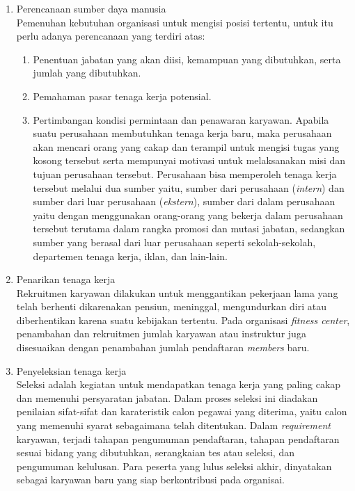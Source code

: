 \begin{enumerate}

\item Perencanaan sumber daya manusia \\
Pemenuhan kebutuhan organisasi untuk mengisi posisi tertentu, untuk itu perlu adanya perencanaan yang terdiri atas:
\begin{enumerate}
	
\item Penentuan jabatan yang akan diisi, kemampuan yang dibutuhkan, serta jumlah yang dibutuhkan.

\item Pemahaman pasar tenaga kerja potensial.

\item Pertimbangan kondisi permintaan dan penawaran karyawan. Apabila suatu perusahaan membutuhkan tenaga kerja baru, maka perusahaan akan mencari orang yang cakap dan terampil untuk mengisi tugas yang kosong tersebut serta mempunyai motivasi untuk melaksanakan misi dan tujuan perusahaan tersebut. Perusahaan bisa memperoleh tenaga kerja tersebut melalui dua sumber yaitu, sumber dari perusahaan (\textit{intern}) dan sumber dari luar perusahaan (\textit{ekstern}), sumber dari dalam perusahaan yaitu dengan menggunakan orang-orang yang bekerja dalam perusahaan tersebut terutama dalam rangka promosi dan mutasi jabatan, sedangkan sumber yang berasal dari luar perusahaan seperti sekolah-sekolah, departemen tenaga kerja, iklan, dan lain-lain.

\end{enumerate}

\item Penarikan tenaga kerja \\
Rekruitmen karyawan dilakukan untuk menggantikan pekerjaan lama yang telah berhenti dikarenakan pensiun, meninggal, mengundurkan diri atau diberhentikan karena suatu kebijakan tertentu. Pada organisasi \textit{fitness center}, penambahan dan rekruitmen jumlah karyawan atau instruktur juga disesuaikan dengan penambahan jumlah pendaftaran \textit{members} baru.

\item Penyeleksian tenaga kerja \\ 
Seleksi adalah kegiatan untuk mendapatkan tenaga kerja yang paling cakap dan memenuhi persyaratan jabatan. Dalam proses seleksi ini diadakan penilaian sifat-sifat dan karateristik calon pegawai yang diterima, yaitu calon yang memenuhi syarat sebagaimana telah ditentukan. Dalam \textit{requirement} karyawan, terjadi tahapan pengumuman pendaftaran, tahapan pendaftaran sesuai bidang yang dibutuhkan, serangkaian tes atau seleksi, dan pengumuman kelulusan. Para peserta yang lulus seleksi akhir, dinyatakan sebagai karyawan baru yang siap berkontribusi pada organisai. 


\end{enumerate}
